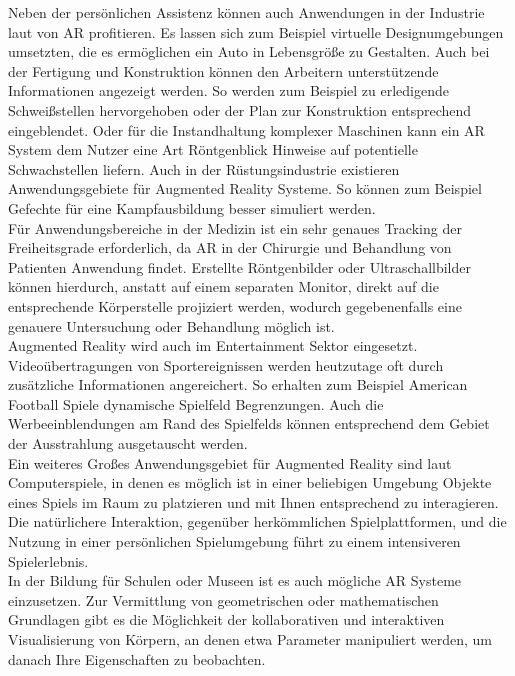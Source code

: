 Neben der persönlichen Assistenz können auch Anwendungen in der Industrie laut \citet{van2010survey} von AR profitieren. Es lassen sich zum Beispiel virtuelle Designumgebungen umsetzten, die es ermöglichen ein Auto in Lebensgröße zu Gestalten. Auch bei der Fertigung und Konstruktion können den Arbeitern unterstützende Informationen angezeigt werden. So werden zum Beispiel zu erledigende Schweißstellen hervorgehoben oder der Plan zur Konstruktion entsprechend eingeblendet. Oder für die Instandhaltung komplexer Maschinen kann ein AR System dem Nutzer eine Art Röntgenblick Hinweise auf potentielle Schwachstellen liefern. Auch in der Rüstungsindustrie existieren Anwendungsgebiete für Augmented Reality Systeme. So können zum Beispiel Gefechte für eine Kampfausbildung besser simuliert werden. \citep{azuma2001recent} \\

Für Anwendungsbereiche in der Medizin ist ein sehr genaues Tracking der Freiheitsgrade erforderlich, da AR in der Chirurgie und Behandlung von Patienten Anwendung findet. Erstellte Röntgenbilder oder Ultraschallbilder können hierdurch, anstatt auf einem separaten Monitor, direkt auf die entsprechende Körperstelle projiziert werden, wodurch gegebenenfalls eine genauere Untersuchung oder Behandlung möglich ist. \citep{van2010survey} \\

Augmented Reality wird auch im Entertainment Sektor eingesetzt. Videoübertragungen von Sportereignissen werden heutzutage oft durch zusätzliche Informationen angereichert. So erhalten zum Beispiel American Football Spiele dynamische Spielfeld Begrenzungen. Auch die Werbeeinblendungen am Rand des Spielfelds können entsprechend dem Gebiet der Ausstrahlung ausgetauscht werden. \citep{azuma2001recent} \\

Ein weiteres Großes Anwendungsgebiet für Augmented Reality sind laut \citet{azuma2001recent} Computerspiele, in denen es möglich ist in einer beliebigen Umgebung Objekte eines Spiels im Raum zu platzieren und mit Ihnen entsprechend zu interagieren. Die natürlichere Interaktion, gegenüber herkömmlichen Spielplattformen, und die Nutzung in einer persönlichen Spielumgebung führt zu einem intensiveren Spielerlebnis. \\

In der Bildung für Schulen oder Museen ist es auch mögliche AR Systeme einzusetzen. Zur Vermittlung von geometrischen oder mathematischen Grundlagen gibt es die Möglichkeit der kollaborativen und interaktiven Visualisierung von Körpern, an denen etwa Parameter manipuliert werden, um danach Ihre Eigenschaften zu beobachten. \citep{van2010survey} \\

